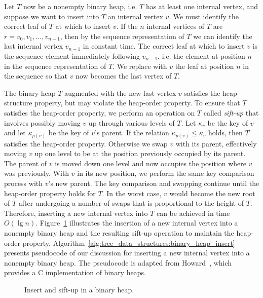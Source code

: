 Let $T$ now be a nonempty binary heap, i.e. $T$ has at least one
internal vertex, and suppose we want to insert into $T$ an internal
vertex $v$. We must identify the correct leaf of $T$ at which to
insert $v$. If the $n$ internal vertices of $T$ are
$r = v_0, v_1, \dots, v_{n-1}$, then by the sequence representation of
$T$ we can identify the last internal vertex $v_{n-1}$ in constant
time. The correct leaf at which to insert $v$ is the sequence element
immediately following $v_{n-1}$, i.e. the element at position $n$ in
the sequence representation of $T$. We replace with $v$ the leaf at
position $n$ in the sequence so that $v$ now becomes the last vertex
of $T$.

The binary heap $T$ augmented with the new last vertex $v$ satisfies
the heap-structure property, but may violate the heap-order
property. To ensure that $T$ satisfies the heap-order property, we
perform an operation on $T$ called
\emph{sift-up} that involves possibly
moving $v$ up through various levels of $T$. Let $\kappa_v$ be the key
of $v$ and let $\kappa_{p(v)}$ be the key of $v$'s parent. If the
relation $\kappa_{p(v)} \leq \kappa_v$ holds, then $T$ satisfies the
heap-order property. Otherwise we swap $v$ with its parent,
effectively moving $v$ up one level to be at the position previously
occupied by its parent. The parent of $v$ is moved down one level and
now occupies the position where $v$ was previously. With $v$ in its
new position, we perform the same key comparison process with $v$'s
new parent. The key comparison and swapping continue until the
heap-order property holds for $T$. In the worst case, $v$ would become
the new root of $T$ after undergoing a number of swaps that is
proportional to the height of $T$. Therefore, inserting a new internal
vertex into $T$ can be achieved in time $O(\lg n)$.
Figure~\ref{fig:tree_data_structures:insert_sift_up_binary_heap}
illustrates the insertion of a new internal vertex into a nonempty
binary heap and the resulting sift-up operation to maintain the
heap-order property.
Algorithm~\ref{alg:tree_data_structures:binary_heap_insert} presents
pseudocode of our discussion for inserting a new internal vertex into
a nonempty binary heap. The pseudocode is adapted from
Howard~\cite{Howard2010}, which provides a C implementation of binary
heaps.

\begin{figure}[!htbp]
\centering

\caption{Insert and sift-up in a binary heap.}
\label{fig:tree_data_structures:insert_sift_up_binary_heap}
\end{figure}

